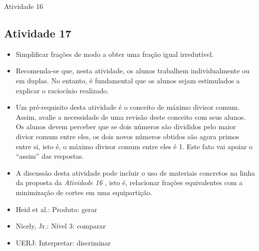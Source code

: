 \begin{multicols}{2}
\begin{resposta*}{Atividade 16}
\end{resposta*}



\subsection{Atividade 17}

\begin{itemize} %
    \item       Simplificar frações de modo a obter uma fração igual 
irredutível.
\end{itemize} %
  
 
\begin{itemize} %
    \item       Recomenda-se que, nesta atividade, os alunos trabalhem 
individualmente ou em duplas. No entanto, é fundamental que os alunos sejam 
estimulados a explicar o raciocínio realizado.
    \item       Um pré-requisito desta atividade é o conceito de máximo divisor 
comum. Assim, avalie a necessidade de uma revisão deste conceito com seus 
alunos. Os alunos devem perceber que se dois números são divididos pelo maior 
divior comum entre eles, os dois novos números obtidos são agora primos entre 
si, isto é, o máximo divisor comum entre eles é 1. Este fato vai apoiar o       
``assim''       das respostas. 
    \item       A discussão desta atividade pode incluir o uso de materiais 
concretos na linha da proposta da \emph{Atividade 16}      , isto é, relacionar  
frações equivalentes com a minimização de cortes em uma equipartição.
\end{itemize} %
  
   \vspace{.1cm}
  
 \vspace{.1cm}
   
\begin{itemize} %
    \item       Heid et al.: Produto: gerar
    \item       Nicely, Jr.: Nível 3: comparar
    \item       UERJ: Interpretar: discriminar
\end{itemize} %


\end{multicols}
